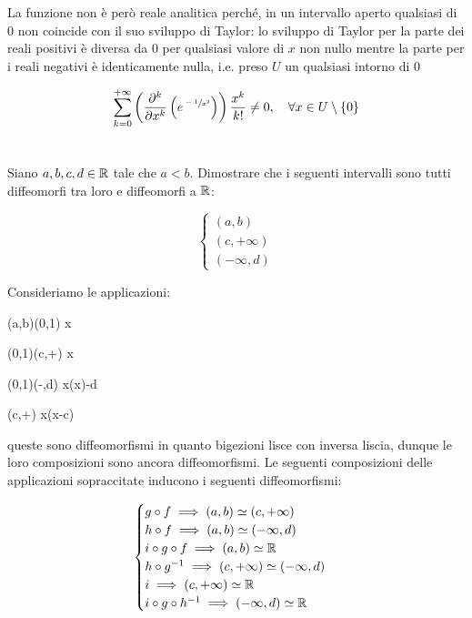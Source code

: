 La funzione non è però reale analitica perché, in un intervallo aperto qualsiasi di 0 non coincide con il suo sviluppo di Taylor: lo sviluppo di Taylor per la parte dei reali positivi è diversa da 0 per qualsiasi valore di $ x $ non nullo mentre la parte per i reali negativi è identicamente nulla, i.e. preso $ U $ un qualsiasi intorno di 0

\begin{equation}
	\sum_{k=0}^{+\infty} \left( \pdv[k]{x} \left( e^{\sfrac{-1}{x^{2}}} \right) \right) \dfrac{x^{k}}{k!} \neq 0 \qcomma \forall x \in U \setminus \{0\}
\end{equation}

\tocless\section{}\label{es1-3}

\begin{tcolorbox}
	Siano $ a,b,c,d \in \mathbb{R} $ tale che $ a<b $. Dimostrare che i seguenti intervalli sono tutti diffeomorfi tra loro e diffeomorfi a $ \mathbb{R} $:
	
	\begin{equation}
		\begin{cases}
			(a,b)\\
			(c,+\infty)\\
			(-\infty,d)
		\end{cases}
	\end{equation}
\end{tcolorbox}

Consideriamo le applicazioni:

%
	{(a,b)}{(0,1)}%
	{x}{}

%
	{(0,1)}{(c,+\infty)}%
	{x}{}
	
%
	{(0,1)}{(-\infty,d)}%
	{x}{\ln(x)-d}
	
%
	{(c,+\infty)}{\R}%
	{x}{\ln(x-c)}

queste sono diffeomorfismi in quanto bigezioni lisce con inversa liscia, dunque le loro composizioni sono ancora diffeomorfismi. Le seguenti composizioni delle applicazioni sopraccitate inducono i seguenti diffeomorfismi:

\begin{equation}
	\begin{cases}
		g \circ f \implies (a,b) \simeq (c,+\infty)\\
		h \circ f \implies (a,b) \simeq (-\infty,d)\\
		i \circ g \circ f \implies (a,b) \simeq \mathbb{R}\\
		h \circ g^{-1} \implies (c,+\infty) \simeq (-\infty,d)\\
		i \implies (c,+\infty) \simeq \mathbb{R}\\
		i \circ g \circ h^{-1} \implies (-\infty,d) \simeq \mathbb{R}
	\end{cases}
\end{equation}

